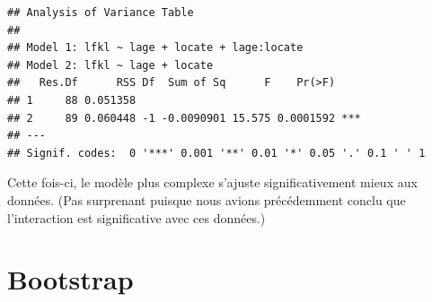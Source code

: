 \documentclass[12pt,]{book}
\begin{document}
\begin{verbatim}
## Analysis of Variance Table
## 
## Model 1: lfkl ~ lage + locate + lage:locate
## Model 2: lfkl ~ lage + locate
##   Res.Df      RSS Df  Sum of Sq      F    Pr(>F)    
## 1     88 0.051358                                   
## 2     89 0.060448 -1 -0.0090901 15.575 0.0001592 ***
## ---
## Signif. codes:  0 '***' 0.001 '**' 0.01 '*' 0.05 '.' 0.1 ' ' 1
\end{verbatim}

Cette fois-ci, le modèle plus complexe s'ajuste significativement mieux aux données. (Pas surprenant puisque nous avions précédemment conclu que l'interaction est significative avec ces données.)

\hypertarget{bootstrap-1}{%
\section{Bootstrap}\label{bootstrap-1}}
\end{document}
